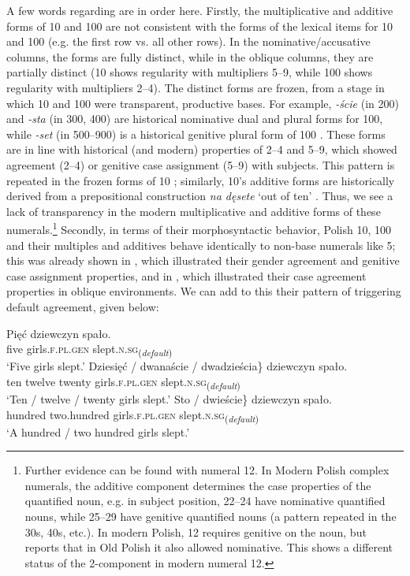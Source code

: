 \documentclass[output=paper]{langscibook}
\begin{document}
A few words regarding  are in order here. Firstly, the multiplicative and additive forms of 10 and 100 are not consistent with the forms of the lexical items for 10 and 100 (e.g. the first row vs. all other rows). In the nominative/accusative columns, the forms are fully distinct, while in the oblique columns, they are partially distinct (10 shows regularity with multipliers 5--9, while 100 shows regularity with multipliers 2--4). The distinct forms are frozen, from a stage in which 10 and 100 were transparent, productive bases. For example, \textit{-ście} (in 200) and \textit{-sta} (in 300, 400) are historical nominative dual and plural forms for 100, while \textit{-set} (in 500--900) is a historical genitive plural form of 100 \citep{dziubala2014num}. These forms are in line with historical (and modern) properties of 2--4 and 5--9, which showed agreement (2--4) or genitive case assignment (5--9) with subjects. This pattern is repeated in the frozen forms of 10 \citep{miechowicz2014hist}; similarly, 10's additive forms are historically derived from a prepositional construction \textit{na dęsete} `out of ten' \citep[86]{dziubala2014num}. Thus, we see a lack of transparency in the modern multiplicative and additive forms of these numerals.\footnote{Further evidence can be found with numeral 12. In Modern Polish complex numerals, the additive component determines the case properties of the quantified noun, e.g. in subject position, 22--24 have nominative quantified nouns, while 25--29 have genitive quantified nouns (a pattern repeated in the 30s, 40s, etc.). In modern Polish, 12 requires genitive on the noun, but \citet[96--97]{dziubala2014num} reports that in Old Polish it also allowed nominative. This shows a different status of the 2-component in modern numeral 12.} 
Secondly, in terms of their morphosyntactic behavior, Polish 10, 100 and their multiples and additives behave identically to non-base numerals like 5; this was already shown in , which illustrated their gender agreement and genitive case assignment properties, and in , which illustrated their case agreement properties in oblique environments. We can add to this their pattern of triggering default agreement, given below:

\ea
\ea \gll Pięć dziewczyn spało.\\
five girls.\textsc{f.pl.gen} slept.\textsc{n.sg}\textsubscript{(\textit{default})}\\
\glt `Five girls slept.'
\ex \gll \minsp{\{} Dziesięć / dwanaście / dwadzieścia\} dziewczyn spało.\\
{} ten {} twelve {} twenty girls.\textsc{f.pl.gen} slept.\textsc{n.sg}\textsubscript{(\textit{default})}\\
\glt `Ten / twelve / twenty girls slept.' \label{klo:ex:defagr10}
\ex \gll \minsp{\{} Sto / dwieście\} dziewczyn spało.\\
{} hundred {} two.hundred girls.\textsc{f.pl.gen} slept.\textsc{n.sg}\textsubscript{(\textit{default})}\\
\glt `A hundred / two hundred girls slept.'
\z \z
\end{document}
